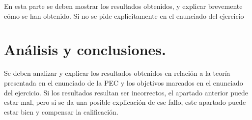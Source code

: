 \documentclass[a4paper,12pt,spanish]{article}
\begin{document}
	
	
	

	En esta parte se deben mostrar
los resultados obtenidos, y explicar brevemente cómo se han obtenido. Si no se pide
explícitamente en el enunciado del ejercicio


	\section{Análisis y conclusiones.}

	Se deben analizar y explicar los resultados obtenidos en relación a
la teoría presentada en el enunciado de la PEC y los objetivos marcados en el enunciado
del ejercicio. Si los resultados resultan ser incorrectos, el apartado anterior puede estar mal,
pero si se da una posible explicación de ese fallo, este apartado puede estar bien y
compensar la calificación.

	
	
	
	
	
\end{document}
